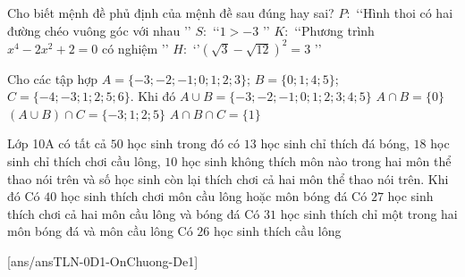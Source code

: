 \begin{ex}%
	Cho biết mệnh đề phủ định của mệnh đề sau đúng hay sai?
	\choiceTF
	{$P\colon$ \lq\lq Hình thoi có hai đường chéo vuông góc với nhau \rq\rq }
	{$S\colon$ \lq\lq $1>-3$ \rq\rq }
	{\True $K\colon$ \lq\lq Phương trình $x^4-2x^2+2=0$ có nghiệm \rq\rq }
	{$H\colon$ \lq\rq $\left(\sqrt{3}-\sqrt{12}\right)^2=3$ \rq\rq}
\end{ex}

\begin{ex}%
	Cho các tập hợp $A=\{-3;-2;-1;0;1;2;3\}$; $B=\{0;1;4;5\}$; $C=\{-4;-3;1;2;5;6\}$. Khi đó
	\choiceTF
	{\True $A\cup B=\{-3;-2;-1;0;1;2;3;4;5\}$}
	{$A\cap B=\{0\}$}
	{\True $(A\cup B)\cap C=\{-3;1;2;5\}$}
	{\True $A\cap B\cap C=\{1\}$}
\end{ex}

\begin{ex}%
	Lớp 10A có tất cả $50$ học sinh trong đó có $13$ học sinh chỉ thích đá bóng, $18$ học sinh chỉ thích chơi cầu lông, $10$ học sinh không thích môn nào trong hai môn thể thao nói trên và số học sinh còn lại thích chơi cả hai môn thể thao nói trên. Khi đó
	\choiceTF
	{\True Có $40$ học sinh thích chơi môn cầu lông hoặc môn bóng đá}
	{Có $27$ học sinh thích chơi cả hai môn cầu lông và bóng đá}
	{\True Có $31$ học sinh thích chỉ một trong hai môn bóng đá và môn cầu lông}
	{Có $26$ học sinh thích cầu lông}
\end{ex}
\TNSA
\setcounter{ex}{0}
[ans/ansTLN-0D1-OnChuong-De1]

